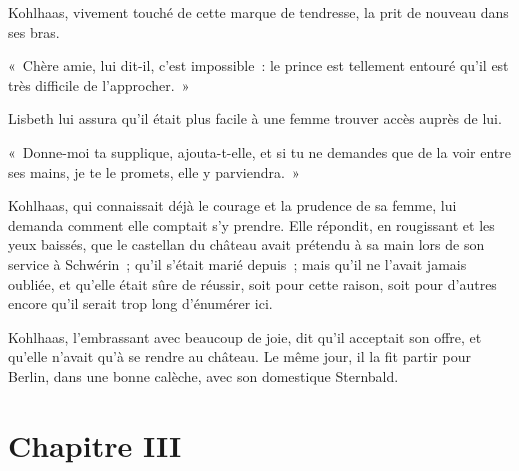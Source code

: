 \documentclass[french,twoside]{book} %
\newcommand\chapteropen{} %
\newcommand\chapterclose{} %
\begin{document}
Kohlhaas, vivement touché de cette marque de tendresse, la prit de nouveau dans ses bras.\par
« Chère amie, lui dit-il, c’est impossible : le prince est tellement entouré qu’il est très difficile de l’approcher. »\par
Lisbeth lui assura qu’il était plus facile à une femme trouver accès auprès de lui.\par
« Donne-moi ta supplique, ajouta-t-elle, et si tu ne demandes que de la voir entre ses mains, je te le promets, elle y parviendra. »\par
Kohlhaas, qui connaissait déjà le courage et la prudence de sa femme, lui demanda comment elle comptait s’y prendre. Elle répondit, en rougissant et les yeux baissés, que le castellan du château avait prétendu à sa main lors de son service à Schwérin ; qu’il s’était marié depuis ; mais qu’il ne l’avait jamais oubliée, et qu’elle était sûre de réussir, soit pour cette raison, soit pour d’autres encore qu’il serait trop long d’énumérer ici.\par
Kohlhaas, l’embrassant avec beaucoup de joie, dit qu’il acceptait son offre, et qu’elle n’avait qu’à se rendre au château. Le même jour, il la fit partir pour Berlin, dans une bonne calèche, avec son domestique Sternbald.
\chapterclose


\chapteropen
\chapter[{Chapitre III}]{Chapitre III}\renewcommand{\leftmark}{Chapitre III}
\end{document}
